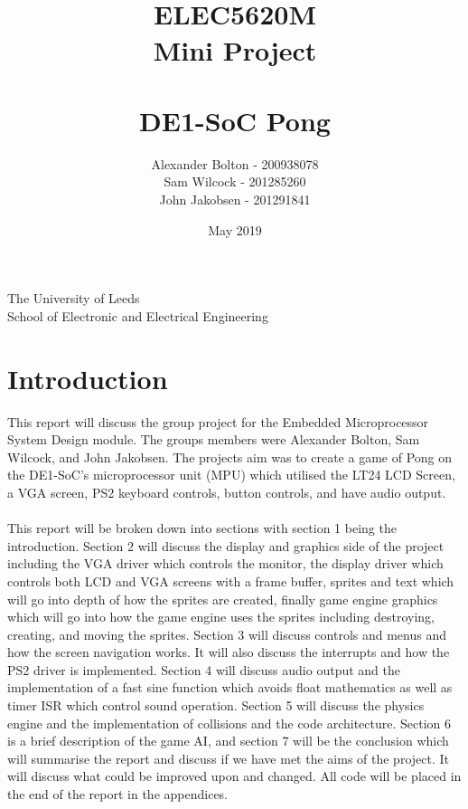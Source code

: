 \documentclass[a4paper,12pt]{article}
\begin{document}
\title{\\ \textbf{ELEC5620M \\ Mini Project \\ \- \\ DE1-SoC Pong }}
\author{Alexander Bolton - 200938078 \\ Sam Wilcock - 201285260\\ John Jakobsen - 201291841}
\date{May 2019}
\maketitle
\thispagestyle{empty}
\begin{center}

\end{center}
\vfill
\begin{center}
The University of Leeds \\  School of Electronic and Electrical Engineering
\end{center}

\newpage

\tableofcontents
\thispagestyle{empty}

\newpage 
{}
\section{Introduction}
\begin{flushleft}
This report will discuss the group project for the Embedded Microprocessor System Design module. The groups members were Alexander Bolton, Sam Wilcock, and John Jakobsen. The projects aim was to create a game of Pong on the DE1-SoC's microprocessor unit (MPU) which utilised the LT24 LCD Screen, a VGA screen, PS2 keyboard controls, button controls, and have audio output.
\\ \- \\
This report will be broken down into sections with section 1 being the introduction. Section 2 will discuss the display and graphics side of the project including the VGA driver which controls the monitor, the display driver which controls both LCD and VGA screens with a frame buffer, sprites and text which will go into depth of how the sprites are created, finally game engine graphics which will go into how the game engine uses the sprites including destroying, creating, and moving the sprites. Section 3 will discuss controls and menus and how the screen navigation works. It will also discuss the interrupts and how the PS2 driver is implemented. Section 4 will discuss audio output and the implementation of a fast sine function which avoids float mathematics as well as timer ISR which control sound operation. Section 5 will discuss the physics engine and the implementation of collisions and the code architecture. Section 6 is a brief description of the game AI, and section 7 will be the conclusion which will summarise the report and discuss if we have met the aims of the project. It will discuss what could be improved upon and changed. All code will be placed in the end of the report in the appendices. 
\end{flushleft}
\newpage
\end{document}

